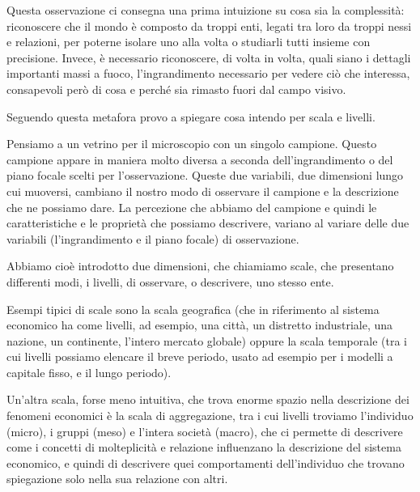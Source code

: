 \documentclass[a4paper, headings=standardclasses]{scrartcl}
\begin{document}
Questa osservazione ci consegna una prima intuizione su cosa sia la complessità: riconoscere che il mondo è composto da troppi enti, legati tra loro da troppi nessi e relazioni, per poterne isolare uno alla volta o studiarli tutti insieme con precisione. Invece, è necessario riconoscere, di volta in volta, quali siano i dettagli importanti massi a fuoco, l'ingrandimento necessario per vedere ciò che interessa, consapevoli però di cosa e perché sia rimasto fuori dal campo visivo.

Seguendo questa metafora provo a spiegare cosa intendo per scala e livelli.

Pensiamo a un vetrino per il microscopio con un singolo campione. Questo campione appare
in maniera molto diversa a seconda dell'ingrandimento o del piano focale scelti per l'osservazione.
Queste due variabili, due dimensioni lungo cui muoversi, cambiano il nostro modo di osservare il campione e la descrizione che ne possiamo dare.
La percezione che abbiamo del campione e quindi le caratteristiche e le proprietà che possiamo
descrivere, variano al variare delle due variabili (l'ingrandimento e il piano focale) di osservazione.

Abbiamo cioè introdotto due dimensioni, che chiamiamo scale, che presentano differenti modi, i livelli, di osservare, o descrivere, uno stesso ente.

Esempi tipici di scale sono la scala geografica (che in riferimento al sistema economico ha come livelli, ad esempio, una città, un distretto industriale, una nazione, un continente, l'intero
mercato globale) oppure la scala temporale (tra i cui livelli possiamo elencare il breve periodo, usato ad esempio per i modelli a capitale fisso, e il lungo periodo).

Un'altra scala, forse meno intuitiva, che trova enorme spazio nella descrizione dei fenomeni economici è la scala di aggregazione, tra i cui livelli troviamo l'individuo (micro), i gruppi (meso) e l'intera società (macro), che ci permette di descrivere come i concetti di molteplicità e relazione influenzano la descrizione del sistema economico, e quindi di descrivere quei comportamenti dell'individuo che trovano spiegazione solo nella sua relazione con altri. 
\end{document}

